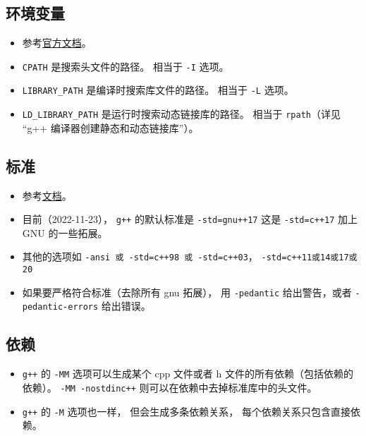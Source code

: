 \subsection{环境变量}
\begin{itemize}
\item 参考\href{https://gcc.gnu.org/onlinedocs/gcc/Environment-Variables.html}{官方文档}。
\item \verb|CPATH| 是搜索头文件的路径。 相当于 \verb|-I| 选项。
\item \verb|LIBRARY_PATH| 是编译时搜索库文件的路径。 相当于 \verb|-L| 选项。
\item \verb|LD_LIBRARY_PATH| 是运行时搜索动态链接库的路径。 相当于 \verb|rpath|（详见 “g++ 编译器创建静态和动态链接库”）。
\end{itemize}

\subsection{标准}
\begin{itemize}
\item 参考\href{https://gcc.gnu.org/onlinedocs/gcc/Standards.html}{文档}。
\item 目前（2022-11-23）， \verb|g++| 的默认标准是 \verb|-std=gnu++17| 这是 \verb|-std=c++17| 加上 GNU 的一些拓展。
\item 其他的选项如 \verb|-ansi 或 -std=c++98 或 -std=c++03|， \verb|-std=c++11或14或17或20|
\item 如果要严格符合标准（去除所有 gnu 拓展）， 用 \verb|-pedantic| 给出警告，或者 \verb|-pedantic-errors| 给出错误。
\end{itemize}

\subsection{依赖}
\begin{itemize}
\item \verb|g++| 的 \verb|-MM| 选项可以生成某个 cpp 文件或者 h 文件的所有依赖（包括依赖的依赖）。 \verb|-MM -nostdinc++| 则可以在依赖中去掉标准库中的头文件。
\item \verb|g++| 的 \verb|-M| 选项也一样， 但会生成多条依赖关系， 每个依赖关系只包含直接依赖。
\end{itemize}

